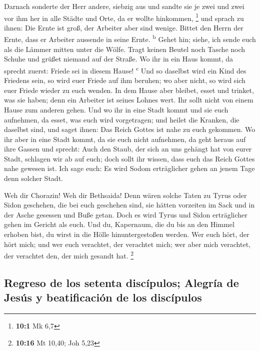  Darnach sonderte der Herr andere, siebzig aus und sandte
sie je zwei und zwei vor ihm her in alle Städte und Orte, da er wollte
hinkommen, \footnote{\textbf{10:1} Mk 6,7}  und sprach zu
ihnen: Die Ernte ist groß, der Arbeiter aber sind wenige. Bittet den
Herrn der Ernte, dass er Arbeiter aussende in seine Ernte.
\textsuperscript{b}  Gehet hin; siehe, ich sende euch als
die Lämmer mitten unter die Wölfe.  Tragt keinen Beutel
noch Tasche noch Schuhe und grüßet niemand auf der Straße.
 Wo ihr in ein Haus kommt, da sprecht zuerst: Friede sei
in diesem Hause! \textsuperscript{c}  Und so daselbst wird
ein Kind des Friedens sein, so wird euer Friede auf ihm beruhen; wo aber
nicht, so wird sich euer Friede wieder zu euch wenden.  In
dem Hause aber bleibet, esset und trinket, was sie haben; denn ein
Arbeiter ist seines Lohnes wert. Ihr sollt nicht von einem Hause zum
anderen gehen.  Und wo ihr in eine Stadt kommt und sie
euch aufnehmen, da esset, was euch wird vorgetragen;  und
heilet die Kranken, die daselbst sind, und saget ihnen: Das Reich Gottes
ist nahe zu euch gekommen.  Wo ihr aber in eine Stadt
kommt, da sie euch nicht aufnehmen, da geht heraus auf ihre Gassen und
sprecht:  Auch den Staub, der sich an uns gehängt hat von
eurer Stadt, schlagen wir ab auf euch; doch sollt ihr wissen, dass euch
das Reich Gottes nahe gewesen ist.  Ich sage euch: Es
wird Sodom erträglicher gehen an jenem Tage denn solcher Stadt.

 Weh dir Chorazin! Weh dir Bethsaida! Denn wären solche
Taten zu Tyrus oder Sidon geschehen, die bei euch geschehen sind, sie
hätten vorzeiten im Sack und in der Asche gesessen und Buße getan.
 Doch es wird Tyrus und Sidon erträglicher gehen im
Gericht als euch.  Und du, Kapernaum, die du bis an den
Himmel erhoben bist, du wirst in die Hölle hinuntergestoßen werden.
 Wer euch hört, der hört mich; und wer euch verachtet,
der verachtet mich; wer aber mich verachtet, der verachtet den, der mich
gesandt hat. \footnote{\textbf{10:16} Mt 10,40; Joh 5,23}

\hypertarget{regreso-de-los-setenta-discuxedpulos-alegruxeda-de-jesuxfas-y-beatificaciuxf3n-de-los-discuxedpulos}{%
\subsection{Regreso de los setenta discípulos; Alegría de Jesús y
beatificación de los
discípulos}\label{regreso-de-los-setenta-discuxedpulos-alegruxeda-de-jesuxfas-y-beatificaciuxf3n-de-los-discuxedpulos}}

